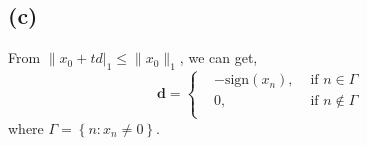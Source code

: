 \documentclass[12pt, a4 paper]{article}
\begin{document}
\begin{framed}
        \subsection{(c)}
        From $\lVert x_{0}+td \rvert_{1} \leq \lVert x_{0} 
        \rVert_{1}$, we can get,
        \begin{equation}
            \mathbf{d} = \left\{
                \begin{aligned}
                &-\text{sign}(x_{n}), &\text{ if } n \in \Gamma  \\
                &0, &\text{ if } n \notin \Gamma \\
                \end{aligned}
                \right.
        \end{equation}
        \indent where $\Gamma = \left\{n: x_{n} \neq 0 \right\}$.

        

    \end{framed}
\end{document}
